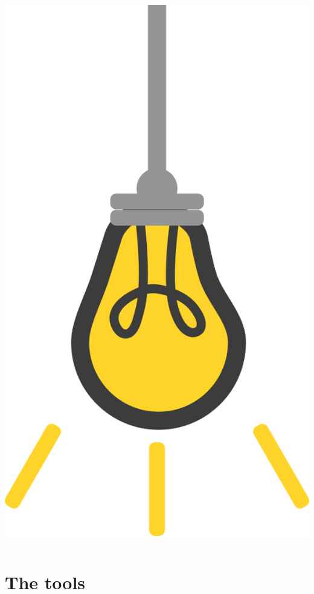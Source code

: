 \documentclass[9pt, aspectratio=169]{beamer}
\begin{document}
\begin{frame}
\begin{columns}
\begin{column}{0.2\textwidth}
            \includegraphics[angle=-30, origin=tr, width=1.5\textwidth]{lightbulb.png}
        \end{column}
    \end{columns}
\end{frame}

\section{The tools}
\end{document}
